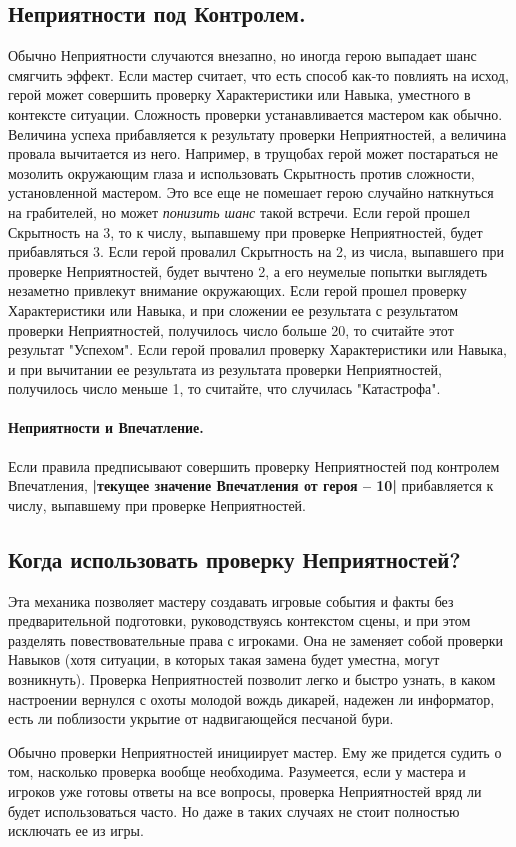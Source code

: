 \subsection{Неприятности под Контролем.}
Обычно Неприятности случаются внезапно, но иногда герою выпадает шанс смягчить эффект. Если мастер считает, что есть способ как-то повлиять на исход, герой может совершить проверку Характеристики или Навыка, уместного в контексте ситуации. Сложность проверки устанавливается мастером как обычно. Величина успеха прибавляется к результату проверки Неприятностей, а величина провала вычитается из него.
\newline Например, в трущобах герой может постараться не мозолить окружающим глаза и использовать Скрытность против сложности, установленной мастером. Это все еще не помешает герою случайно наткнуться на грабителей, но может \textit{понизить шанс} такой встречи. Если герой прошел Скрытность на 3, то к числу, выпавшему при проверке Неприятностей, будет прибавляться 3. Если герой провалил Скрытность на 2, из числа, выпавшего при проверке Неприятностей, будет вычтено 2, а его неумелые попытки выглядеть незаметно привлекут внимание окружающих.
\newline Если герой прошел проверку Характеристики или Навыка, и при сложении ее результата с результатом проверки Неприятностей, получилось число больше 20, то считайте этот результат "Успехом". Если герой провалил проверку Характеристики или Навыка, и при вычитании ее результата из результата проверки Неприятностей, получилось число меньше 1, то считайте, что случилась "Катастрофа".
\paragraph{Неприятности и Впечатление.} Если правила предписывают совершить проверку Неприятностей под контролем Впечатления, \textbf{|текущее значение Впечатления от героя – 10|} прибавляется к числу, выпавшему при проверке Неприятностей.

\subsection{Когда использовать проверку Неприятностей?}
Эта механика позволяет мастеру создавать игровые события и факты без предварительной подготовки, руководствуясь контекстом сцены, и при этом разделять повествовательные права с игроками. Она не заменяет собой проверки Навыков (хотя ситуации, в которых такая замена будет уместна, могут возникнуть). Проверка Неприятностей позволит легко и быстро узнать, в каком настроении вернулся с охоты молодой вождь дикарей, надежен ли информатор, есть ли поблизости укрытие от надвигающейся песчаной бури. 

\begin{tcolorbox}
    Обычно проверки Неприятностей инициирует мастер. Ему же придется судить о том, насколько проверка вообще необходима. Разумеется, если у мастера и игроков уже готовы ответы на все вопросы, проверка Неприятностей вряд ли будет использоваться часто. Но даже в таких случаях не стоит полностью исключать ее из игры.
\end{tcolorbox}
